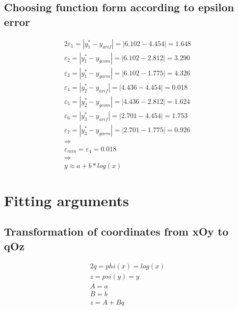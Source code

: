 \documentclass{article}%
\begin{document}
%
\subsection{Choosing function form according to epsilon error}%
\label{subsec:Choosingfunctionformaccordingtoepsilonerror}%
\begin{alignat*}{2}%
\varepsilon_1
        = |y_1^* - y_{arif}| = |6.102 - 4.454| = 1.648 \\%
\varepsilon_2
        = |y_1^* - y_{geom}| = |6.102 - 2.812| = 3.290 \\%
\varepsilon_3
        = |y_1^* - y_{garm}| = |6.102 - 1.775| = 4.326 \\%
\varepsilon_4
        = |y_2^* - y_{arif}| = |4.436 - 4.454| = 0.018 \\%
\varepsilon_5
        = |y_2^* - y_{geom}| = |4.436 - 2.812| = 1.624 \\%
\varepsilon_6
        = |y_3^* - y_{arif}| = |2.701 - 4.454| = 1.753 \\%
\varepsilon_7
        = |y_3^* - y_{garm}| = |2.701 - 1.775| = 0.926 \\%
\Rightarrow \\
                    \varepsilon_{min}
                    = \varepsilon_4
                    = 0.018 \\%
\Rightarrow \\
                    y \approx a + b * log(x)%
\end{alignat*}

%
\section{Fitting arguments}%
\label{sec:Fittingarguments}%
\subsection{Transformation of coordinates from xOy to qOz}%
\label{subsec:TransformationofcoordinatesfromxOytoqOz}%
\begin{alignat*}{2}%
q = phi(x) = log(x) \\%
z = psi(y) = y \\%
A = a \\%
B = b \\%
z = A + Bq%
\end{alignat*}

%
\end{document}
